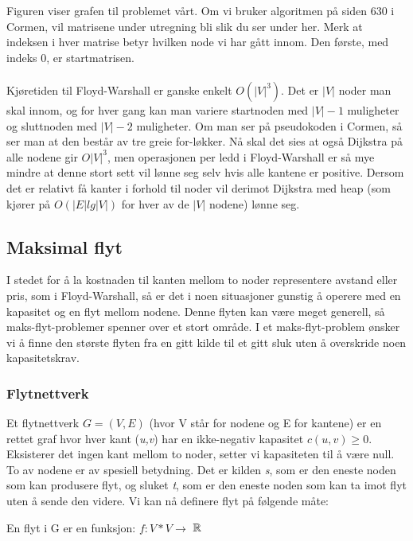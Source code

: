 \noindent Figuren viser grafen til problemet vårt. Om vi bruker algoritmen på siden 630 i Cormen, vil matrisene under utregning bli slik du ser under her. Merk at indeksen i hver matrise betyr hvilken node vi har gått innom. Den første, med indeks 0, er startmatrisen. 
\\\\
\noindent Kjøretiden til Floyd-Warshall er ganske enkelt $O(|V|^3)$. Det er $|V|$ noder man skal innom, og for hver gang kan man variere startnoden med $|V| - 1$ muligheter og sluttnoden med $|V| - 2$ muligheter. Om man ser på pseudokoden i Cormen, så ser man at den består av tre greie for-løkker. Nå skal det sies at også Dijkstra på alle nodene gir $O|V|^3$, men operasjonen per ledd i Floyd-Warshall er så mye mindre at denne stort sett vil lønne seg selv hvis alle kantene er positive. Dersom det er relativt få kanter i forhold til noder vil derimot Dijkstra med heap (som kjører på $O(|E| lg |V|)$ for hver av de $|V|$ nodene) lønne seg.

\subsection{Maksimal flyt}
I stedet for å la kostnaden til kanten mellom to noder representere avstand eller pris, som i Floyd-Warshall, så er det i noen situasjoner gunstig å operere med en kapasitet og en flyt mellom nodene. Denne flyten kan være meget generell, så maks-flyt-problemer spenner over et stort område. I et maks-flyt-problem ønsker vi å finne den største flyten fra en gitt kilde til et gitt sluk uten å overskride noen kapasitetskrav.

\subsubsection{Flytnettverk}
Et flytnettverk $G = (V,E)$ (hvor V står for nodene og E for kantene) er en rettet graf hvor hver kant (\textit{u,v}) har en ikke-negativ kapasitet $c(u,v) \geq 0$. Eksisterer det ingen kant mellom to noder, setter vi kapasiteten til å være null. To av nodene er av spesiell betydning. Det er kilden \textit{s}, som er den eneste noden som kan produsere flyt, og sluket \textit{t}, som er den eneste noden som kan ta imot flyt uten å sende den videre. Vi kan nå definere flyt på følgende måte:
\begin{center}
En flyt i G er en funksjon: $f: V * V \rightarrow$  ${\Bbb R}$
\end{center}

